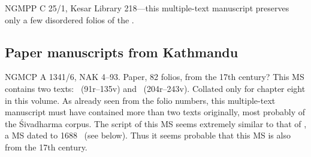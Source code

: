 NGMPP C 25/1, Kesar Library 218---this multiple-text manuscript
preserves only a few disordered folios of the \VSS.

\bigskip

\subsection{Paper manuscripts from Kathmandu}

NGMCP A 1341/6, NAK 4--93. Paper, 82 folios,
from the 17th century? 
This MS contains two texts: 
\SDhSangr\ (\fols91r--135v) and 
\Vss\ (\fols204r--243v). Collated only for
chapter eight in this volume. As already seen
from the folio numbers, this multiple-text
manuscript must have contained more than two
texts originally, most probably of the
Śivadharma corpus. 
The script of this MS seems extremely similar to that 
of \msPaperC, a MS dated to 1688 \CE\ (see below).
Thus it seems probable that this MS is also
from the 17th century.

